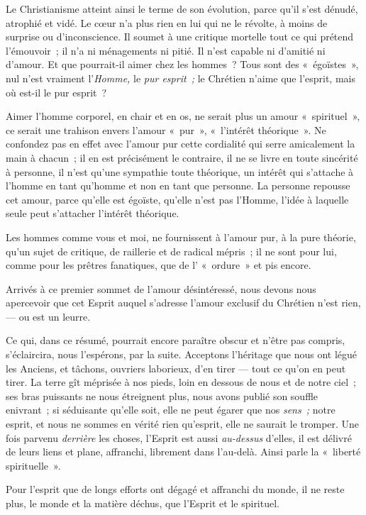 \documentclass[french,twoside]{book} %
\begin{document}
Le Christianisme atteint ainsi le terme de son évolution, parce qu’il s’est dénudé, atrophié et vidé. Le cœur n’a plus rien en lui qui ne le révolte, à moins de surprise ou d’inconscience. Il soumet à une critique mortelle tout ce qui prétend l’émouvoir ; il n’a ni ménagements ni pitié. Il n’est capable ni d’amitié ni d’amour. Et que pourrait-il aimer chez les hommes ? Tous sont des « égoïstes », nul n’est vraiment l’\emph{Homme,} le \emph{pur esprit ;} le Chrétien n’aime que l’esprit, mais où est-il le pur esprit ?\par
Aimer l’homme corporel, en chair et en os, ne serait plus un amour « spirituel », ce serait une trahison  envers l’amour « pur », « l’intérêt théorique ». Ne confondez pas en effet avec l’amour pur cette cordialité qui serre amicalement la main à chacun ; il en est précisément le contraire, il ne se livre en toute sincérité à personne, il n’est qu’une sympathie toute théorique, un intérêt qui s’attache à l’homme en tant qu’homme et non en tant que personne. La personne repousse cet amour, parce qu’elle est égoïste, qu’elle n’est pas l’Homme, l’idée à laquelle seule peut s’attacher l’intérêt théorique.\par
Les hommes comme vous et moi, ne fournissent à l’amour pur, à la pure théorie, qu’un sujet de critique, de raillerie et de radical mépris ; il ne sont pour lui, comme pour les prêtres fanatiques, que de l’ « ordure » et pis encore.\par
Arrivés à ce premier sommet de l’amour désintéressé, nous devons nous apercevoir que cet Esprit auquel s’adresse l’amour exclusif du Chrétien n’est rien, — ou est un leurre.\par
Ce qui, dans ce résumé, pourrait encore paraître obscur et n’être pas compris, s’éclaircira, nous l’espérons, par la suite. Acceptons l’héritage que nous ont légué les Anciens, et tâchons, ouvriers laborieux, d’en tirer — tout ce qu’on en peut tirer. La terre gît méprisée à nos pieds, loin en dessous de nous et de notre ciel ; ses bras puissants ne nous étreignent plus, nous avons publié son souffle enivrant ; si séduisante qu’elle soit, elle ne peut égarer que nos \emph{sens ; }notre esprit, et nous ne sommes en vérité rien qu’esprit, elle ne saurait le tromper. Une fois parvenu \emph{derrière} les choses, l’Esprit est aussi \emph{au-dessus} d’elles, il est délivré de leurs liens et plane, affranchi, librement dans l’au-delà. Ainsi parle la « liberté spirituelle ».\par
Pour l’esprit que de longs efforts ont dégagé et affranchi du monde, il ne reste plus, le monde et la matière déchus, que l’Esprit et le spirituel.\par
\end{document}
